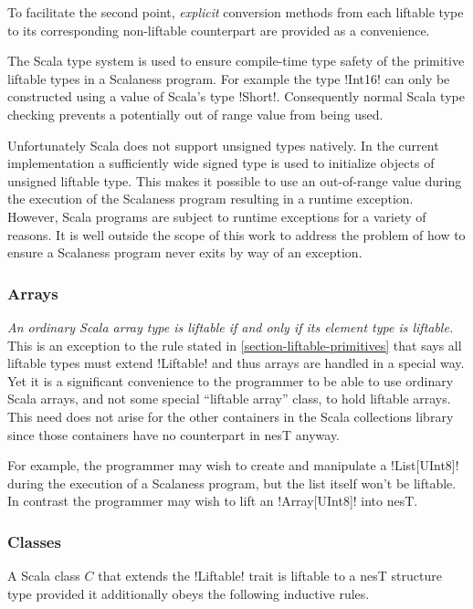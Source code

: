 To facilitate the second point, \emph{explicit} conversion methods from each liftable type to
its corresponding non-liftable counterpart are provided as a convenience.

The Scala type system is used to ensure compile-time type safety of the primitive liftable types
in a Scalaness program. For example the type !Int16! can only be constructed using a value of
Scala's type !Short!. Consequently normal Scala type checking prevents a potentially out of
range value from being used.

Unfortunately Scala does not support unsigned types natively. In the current implementation a
sufficiently wide signed type is used to initialize objects of unsigned liftable type. This
makes it possible to use an out-of-range value during the execution of the Scalaness program
resulting in a runtime exception. However, Scala programs are subject to runtime exceptions for
a variety of reasons. It is well outside the scope of this work to address the problem of how to
ensure a Scalaness program never exits by way of an exception.

\subsubsection{Arrays}
\label{section-liftable-arrays}

\emph{An ordinary Scala array type is liftable if and only if its element type is liftable.}
This is an exception to the rule stated in \autoref{section-liftable-primitives} that says all
liftable types must extend !Liftable! and thus arrays are handled in a special way. Yet it is a
significant convenience to the programmer to be able to use ordinary Scala arrays, and not some
special ``liftable array'' class, to hold liftable arrays. This need does not arise for the
other containers in the Scala collections library since those containers have no counterpart in
nesT anyway.

For example, the programmer may wish to create and manipulate a !List[UInt8]! during the
execution of a Scalaness program, but the list itself won't be liftable. In contrast the
programmer may wish to lift an !Array[UInt8]! into nesT.

\subsubsection{Classes}
\label{section-liftable-classes}

A Scala class $C$ that extends the !Liftable! trait is liftable to a nesT structure type
provided it additionally obeys the following inductive rules.

